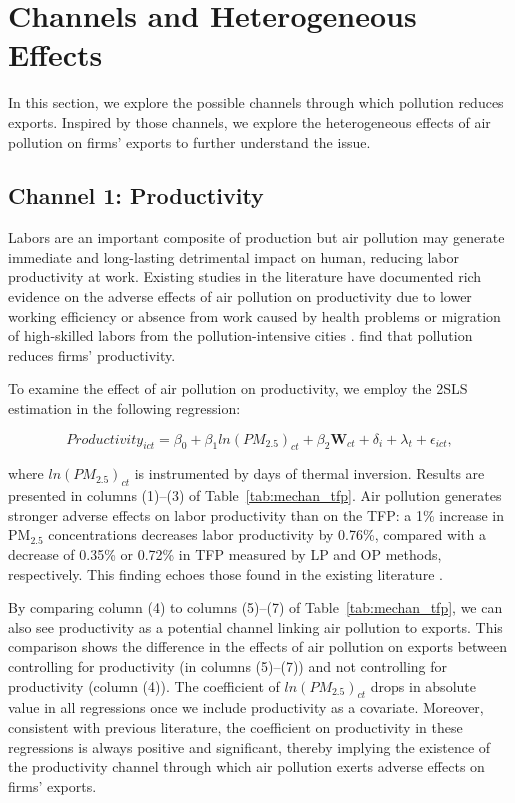 \documentclass[12pt]{article}
\begin{document}
\section{Channels and Heterogeneous Effects}
\label{sec:5} %

In this section, we explore the possible channels through which pollution
reduces exports. Inspired by those channels, we explore the heterogeneous
effects of air pollution on firms' exports to further understand the issue. 

\subsection{Channel 1: Productivity}
\label{sec:5.1} 
Labors are an important composite of production but air
pollution may generate immediate and long-lasting detrimental impact on
human, reducing labor productivity at work. Existing studies in the
literature have documented rich evidence on the adverse effects of air
pollution on productivity due to lower working efficiency or absence from
work caused by health problems %
\citep{chang2016particulate,fu2021air,somanathan2021impact} or migration of
high-skilled labors from the pollution-intensive cities %
\citep{chen2022effect,NBERw28401}. %
\citep{fu2021air,somanathan2021impact,chang2016particulate,adhvaryu2022management}
find that pollution reduces firms' productivity.

To examine the effect of air pollution on productivity, we
employ the 2SLS estimation in the following regression:

\begin{equation} \label{equ3}
Productivity_{ict}=\beta _{0}+\beta _{1}ln(PM_{2.5})_{ct}+\beta _{2}\mathbf{W}%
_{ct}+\delta _{i}+\lambda _{t}+\epsilon _{ict},
\end{equation}

where $ln(PM_{2.5})_{ct}$ is instrumented by days of thermal inversion. Results
are presented in columns (1)--(3) of Table~\ref{tab:mechan_tfp}. Air
pollution generates stronger adverse effects on labor productivity than on
the TFP: a 1\% increase in $\mathrm{PM_{2.5}}$ concentrations decreases labor productivity by 0.76\%,
compared with a decrease of 0.35\% or 0.72\% in TFP measured by LP and OP
methods, respectively. This finding echoes those found in the existing
literature %
\citep{fu2021air,somanathan2021impact,chang2016particulate,adhvaryu2022management}%
.

By comparing column (4) to columns (5)--(7) of Table~\ref{tab:mechan_tfp},
we can also see productivity as a potential channel linking air pollution to
exports. This comparison shows the difference in the effects of air
pollution on exports between controlling for productivity (in columns (5)--(7)) and not controlling for productivity (column
(4)). The coefficient of $ln(PM_{2.5})_{ct}$ drops
in absolute value in all regressions once we include productivity as a
covariate. Moreover, consistent with previous literature, the coefficient on productivity in these regressions is always positive and significant, thereby implying the existence of the productivity channel
through which air pollution exerts adverse effects on firms' exports. 
\end{document}
